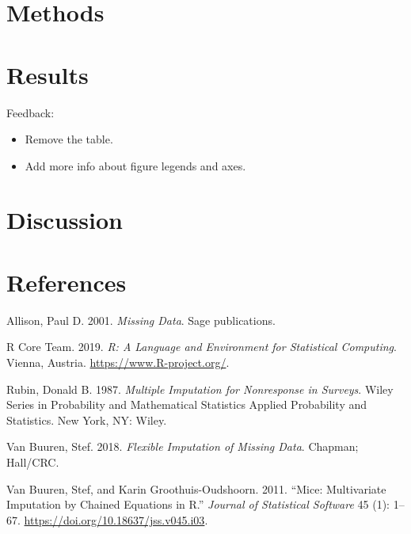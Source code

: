 \documentclass[
]{article}
\begin{document}
\hypertarget{methods}{%
\section{Methods}\label{methods}}

\hypertarget{results}{%
\section{Results}\label{results}}

Feedback:

\begin{itemize}
\item
  Remove the table.
\item
  Add more info about figure legends and axes.
\end{itemize}

\hypertarget{discussion}{%
\section{Discussion}\label{discussion}}

\hypertarget{references}{%
\section*{References}\label{references}}

\hypertarget{refs}{}
\leavevmode\hypertarget{ref-alli02}{}%
Allison, Paul D. 2001. \emph{Missing Data}. Sage publications.

\leavevmode\hypertarget{ref-R}{}%
R Core Team. 2019. \emph{R: A Language and Environment for Statistical
Computing}. Vienna, Austria. \url{https://www.R-project.org/}.

\leavevmode\hypertarget{ref-rubin87}{}%
Rubin, Donald B. 1987. \emph{Multiple Imputation for Nonresponse in
Surveys}. Wiley Series in Probability and Mathematical Statistics
Applied Probability and Statistics. New York, NY: Wiley.

\leavevmode\hypertarget{ref-buur18}{}%
Van Buuren, Stef. 2018. \emph{Flexible Imputation of Missing Data}.
Chapman; Hall/CRC.

\leavevmode\hypertarget{ref-mice}{}%
Van Buuren, Stef, and Karin Groothuis-Oudshoorn. 2011. ``Mice:
Multivariate Imputation by Chained Equations in R.'' \emph{Journal of
Statistical Software} 45 (1): 1--67.
\url{https://doi.org/10.18637/jss.v045.i03}.
\end{document}
